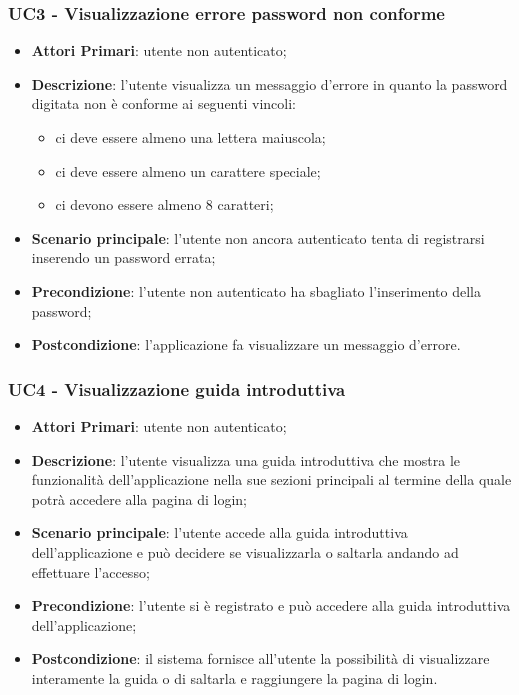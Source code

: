 \subsubsection{UC3 - Visualizzazione errore password non conforme}
\begin{itemize}
	\item \textbf{Attori Primari}: utente non autenticato;
	\item \textbf{Descrizione}: l'utente visualizza un messaggio d'errore in quanto la password digitata non è conforme ai seguenti vincoli:
		\begin{itemize}
			\item ci deve essere almeno una lettera maiuscola;
			\item ci deve essere almeno un carattere speciale;
			\item ci devono essere almeno 8 caratteri;
		\end{itemize}
	\item \textbf{Scenario principale}: l'utente non ancora autenticato tenta di registrarsi inserendo un password errata;
	\item \textbf{Precondizione}: l'utente non autenticato ha sbagliato l'inserimento della password; 
	\item \textbf{Postcondizione}: l'applicazione fa visualizzare un messaggio d'errore.
\end{itemize}

\subsubsection{UC4 - Visualizzazione guida introduttiva}
\begin{itemize}
	\item \textbf{Attori Primari}: utente non autenticato;
	\item \textbf{Descrizione}: l'utente visualizza una guida introduttiva che mostra le funzionalità dell'applicazione nella sue sezioni principali al termine della quale potrà accedere alla pagina di login;
	\item \textbf{Scenario principale}: l'utente accede alla guida introduttiva dell'applicazione e può decidere se visualizzarla o saltarla andando ad effettuare l'accesso;
	\item \textbf{Precondizione}: l'utente si è registrato e può accedere alla guida introduttiva dell'applicazione;
	\item \textbf{Postcondizione}: il sistema fornisce all'utente la possibilità di visualizzare interamente la guida o di saltarla e raggiungere la pagina di login.
\end{itemize}

